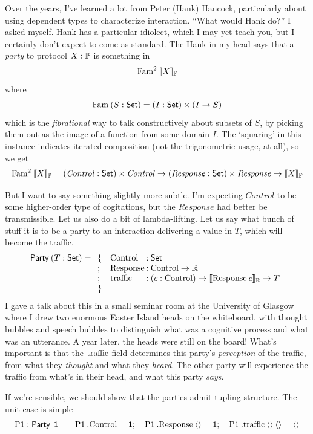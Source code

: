 \documentclass{book}
\newcommand{\D}[1]{\blue{\ensuremath{\mathsf{#1}}}}
\newcommand{\C}[1]{\red{\ensuremath{\mathsf{#1}}}}
\newcommand{\F}[1]{\green{\ensuremath{\mathrm{#1}}}}
\newcommand{\SET}{\D{\mathsf{Set}}}
\newcommand{\vd}{\C{\langle\rangle}}
\begin{document}
\newcommand{\FAM}{\F{Fam}}
\newcommand{\Party}[1]{\D{Party}\:#1}

Over the years, I've learned a lot from Peter (Hank) Hancock, particularly about using dependent types to characterize interaction. ``What would Hank do?'' I asked myself. Hank has a particular idiolect, which I may yet teach you, but I certainly don't expect to come as standard. The Hank in my head says that a \emph{party} to protocol $X:\Protocol$ is something in
\[
\FAM^2\:\protocol{X}
\]
where
\[
\FAM\:(S:\SET) = (I:\SET)\times (I\to S)
\]
which is the \emph{fibrational} way to talk constructively about subsets of $S$, by picking them out as the image of a function from some domain $I$. The `squaring' in this instance indicates iterated composition (not the trigonometric usage, at all), so we get
\[
\FAM^2\:\protocol{X} =
(\mathit{Control}:\SET)\times \mathit{Control}\to (\mathit{Response}:\SET)\times \mathit{Response}\to \protocol{X}
\]

But I want to say something slightly more subtle. I'm expecting
$\mathit{Control}$ to be some higher-order type of cogitations,
but the $\mathit{Response}$ had better be transmissible. Let us
also do a bit of lambda-lifting. Let us say what bunch of stuff
it is to be a party to an interaction delivering a value in $T$,
which will become the traffic.
\[
\Party{(T:\SET)} = \begin{array}[t]{ll@{\::\:}l}
  \{ & \F{Control} & \SET \\
  ;  & \F{Response} & \F{Control}\to\Record \\
  ;  & \F{traffic}  & (c : \F{Control}) \to
  \record{\F{Response}\:c} \to T \\
  \}\\
\end{array}\]
I gave a talk about this in a small seminar room at the University of Glasgow where I drew two enormous Easter Island heads on the whiteboard, with thought bubbles and speech bubbles to distinguish what was a cognitive process and what was an utterance. A year later, the heads were still on the board! What's important is that the $\F{traffic}$ field determines this party's \emph{perception} of the traffic, from what they \emph{thought} and what they \emph{heard}. The other party will experience the traffic from what's in their head, and what this party \emph{says}.

If we're sensible, we should show that the parties admit tupling
structure. The unit case is simple
\[
\F{P1}:\Party\:\D{1}
\qquad
\F{P1}\:.\F{Control} = \D{1};\quad
\F{P1}\:.\F{Response}\:\vd = \C{1};\quad
\F{P1}\:.\F{traffic}\:\vd\:\vd = \vd
\]
\end{document}
